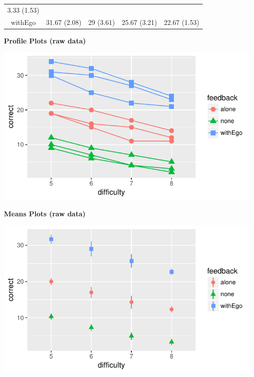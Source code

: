 \documentclass[]{article}
\begin{document}
\begin{longtable}[]{@{}ccccc@{}}
\begin{minipage}[t]{0.18\columnwidth}
3.33 (1.53)\strut
\end{minipage}\tabularnewline
\begin{minipage}[t]{0.13\columnwidth}\centering\strut
withEgo\strut
\end{minipage} & \begin{minipage}[t]{0.18\columnwidth}\centering\strut
31.67 (2.08)\strut
\end{minipage} & \begin{minipage}[t]{0.17\columnwidth}\centering\strut
29 (3.61)\strut
\end{minipage} & \begin{minipage}[t]{0.18\columnwidth}\centering\strut
25.67 (3.21)\strut
\end{minipage} & \begin{minipage}[t]{0.18\columnwidth}\centering\strut
22.67 (1.53)\strut
\end{minipage}\tabularnewline
\bottomrule
\end{longtable}

\textbf{Profile Plots (raw data)}

\begin{center}\includegraphics{Unit_5_assignment_KEY_R__spr18__files/figure-latex/unnamed-chunk-60-1} \end{center}

\textbf{Means Plots (raw data)}

\begin{center}\includegraphics{Unit_5_assignment_KEY_R__spr18__files/figure-latex/unnamed-chunk-61-1} \end{center}
\end{document}
